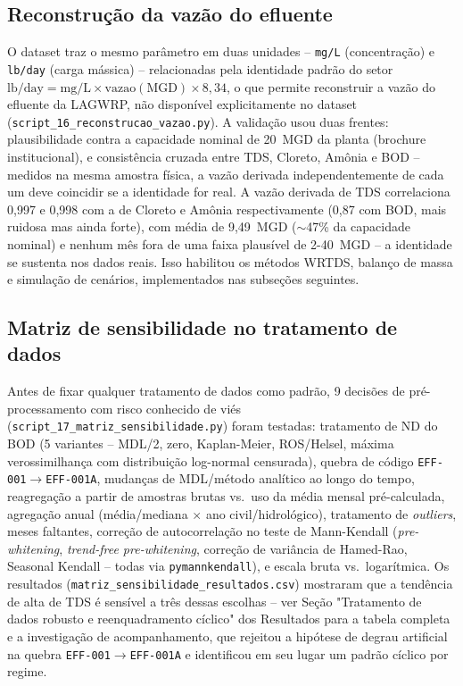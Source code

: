 \subsection{Reconstrução da vazão do efluente}

O dataset traz o mesmo parâmetro em duas unidades -- \texttt{mg/L} (concentração) e \texttt{lb/day} (carga mássica) -- relacionadas pela identidade padrão do setor $\mathrm{lb/day} = \mathrm{mg/L} \times \mathrm{vazao(MGD)} \times 8{,}34$, o que permite reconstruir a vazão do efluente da LAGWRP, não disponível explicitamente no dataset (\texttt{script\_16\_reconstrucao\_vazao.py}). A validação usou duas frentes: plausibilidade contra a capacidade nominal de 20~MGD da planta (brochure institucional), e consistência cruzada entre TDS, Cloreto, Amônia e BOD -- medidos na mesma amostra física, a vazão derivada independentemente de cada um deve coincidir se a identidade for real. A vazão derivada de TDS correlaciona 0,997 e 0,998 com a de Cloreto e Amônia respectivamente (0,87 com BOD, mais ruidosa mas ainda forte), com média de 9,49~MGD ($\sim$47\% da capacidade nominal) e nenhum mês fora de uma faixa plausível de 2-40~MGD -- a identidade se sustenta nos dados reais. Isso habilitou os métodos WRTDS, balanço de massa e simulação de cenários, implementados nas subseções seguintes.

\subsection{Matriz de sensibilidade no tratamento de dados}

Antes de fixar qualquer tratamento de dados como padrão, 9 decisões de pré-processamento com risco conhecido de viés (\texttt{script\_17\_matriz\_sensibilidade.py}) foram testadas: tratamento de ND do BOD (5 variantes -- MDL/2, zero, Kaplan-Meier, ROS/Helsel, máxima verossimilhança com distribuição log-normal censurada), quebra de código \texttt{EFF-001}$\to$\texttt{EFF-001A}, mudanças de MDL/método analítico ao longo do tempo, reagregação a partir de amostras brutas vs.\ uso da média mensal pré-calculada, agregação anual (média/mediana $\times$ ano civil/hidrológico), tratamento de \textit{outliers}, meses faltantes, correção de autocorrelação no teste de Mann-Kendall (\textit{pre-whitening}, \textit{trend-free pre-whitening}, correção de variância de Hamed-Rao, Seasonal Kendall -- todas via \texttt{pymannkendall}), e escala bruta vs.\ logarítmica. Os resultados (\texttt{matriz\_sensibilidade\_resultados.csv}) mostraram que a tendência de alta de TDS é sensível a três dessas escolhas -- ver Seção "Tratamento de dados robusto e reenquadramento cíclico" dos Resultados para a tabela completa e a investigação de acompanhamento, que rejeitou a hipótese de degrau artificial na quebra \texttt{EFF-001}$\to$\texttt{EFF-001A} e identificou em seu lugar um padrão cíclico por regime.

